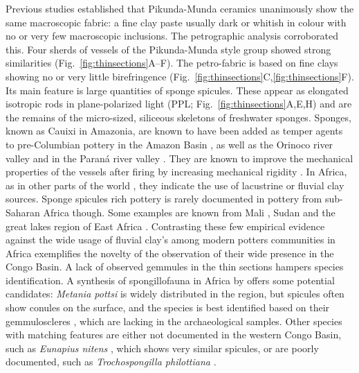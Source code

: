 \documentclass[smallextended,natbib]{svjour3}       %
\begin{document}
Previous studies \citep[60--69]{Seidensticker.2021e} established that Pikunda-Munda ceramics unanimously show the same macroscopic fabric: a fine clay paste usually dark or whitish in colour with no or very few macroscopic inclusions. The petrographic analysis corroborated this. Four sherds of vessels of the Pikunda-Munda style group showed strong similarities (Fig.~\ref{fig:thinsections}A--F). The petro-fabric is based on fine clays showing no or very little birefringence (Fig.~\ref{fig:thinsections}C,\ref{fig:thinsections}F). Its main feature is large quantities of sponge spicules. These appear as elongated isotropic rods in plane-polarized light (PPL; Fig.~\ref{fig:thinsections}A,E,H) and are the remains of the micro-sized, siliceous skeletons of freshwater sponges. Sponges, known as Cauixi in Amazonia, are known to have been added as temper agents to pre-Columbian pottery in the Amazon Basin \citep{Linne.1932,Linne.1957,Costa.2004,Rodrigues.2017,Villagran.2022}, as well as the Orinoco river valley \citep{LozadaMendieta.2019} and in the Paraná river valley \citep{Ottalagano.2016}. They are known to improve the mechanical properties of the vessels after firing by increasing mechanical rigidity \citep{Natalio.2015}. In Africa, as in other parts of the world \citep{Cordell.1993,Bloch.2019}, they indicate the use of lacustrine or fluvial clay sources. Sponge spicules rich pottery is rarely documented in pottery from sub-Saharan Africa though. Some examples are known from Mali \citep{Brissaud.1986,Mcintosh.1989,Nixon.2017}, Sudan \citep{Adamson.1987} and the great lakes region of East Africa \citep[185]{Ashley.2005}. Contrasting these few empirical evidence against the wide usage of fluvial clay's among modern potters communities in Africa \citep[19 Map~1]{Drost.1967} exemplifies the novelty of the observation of their wide presence in the Congo Basin. A lack of observed gemmules in the thin sections hampers species identification. A synthesis of spongillofauna in Africa by \citet{Manconi.2009} offers some potential candidates: \textit{Metania pottsi} is widely distributed in the region, but spicules often show conules on the surface, and the species is best identified based on their gemmuloscleres \citep[38--47]{Manconi.2009}, which are lacking in the archaeological samples. Other species with matching features are either not documented in the western Congo Basin, such as \textit{Eunapius nitens} \citep[149--151]{Manconi.2009}, which shows very similar spicules, or are poorly documented, such as \textit{Trochospongilla philottiana} \citep[198--199]{Manconi.2009}. 
\end{document}
